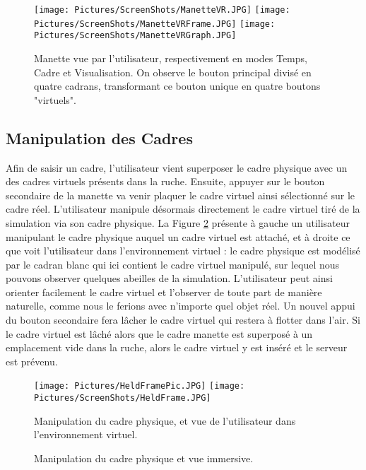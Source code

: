 		\begin{figure}
		\centering
		\texttt{[image: Pictures/ScreenShots/ManetteVR.JPG]}
		\texttt{[image: Pictures/ScreenShots/ManetteVRFrame.JPG]}
		\texttt{[image: Pictures/ScreenShots/ManetteVRGraph.JPG]}
		\caption[Modes de manette vus par l'utilisateur.]{Manette vue par l'utilisateur, respectivement en modes Temps, Cadre et Visualisation. On observe le bouton principal divisé en quatre cadrans, transformant ce bouton unique en quatre boutons "virtuels".}
		\label{ManetteVR}
		\end{figure}
		
		\subsection{Manipulation des Cadres}		
		
			
		Afin de saisir un cadre, l'utilisateur vient superposer le cadre physique avec un des cadres virtuels présents dans la ruche. Ensuite, appuyer sur le bouton secondaire de la manette va venir plaquer le cadre virtuel ainsi sélectionné sur le cadre réel. L'utilisateur manipule désormais directement le cadre virtuel tiré de la simulation via son cadre physique. La Figure \ref{equiVRTUI} présente à gauche un utilisateur manipulant le cadre physique auquel un cadre virtuel est attaché, et à droite ce que voit l'utilisateur dans l'environnement virtuel : le cadre physique est modélisé par le cadran blanc qui ici contient le cadre virtuel manipulé, sur lequel nous pouvons observer quelques abeilles de la simulation. L'utilisateur peut ainsi orienter facilement le cadre virtuel et l'observer de toute part de manière naturelle, comme nous le ferions avec n'importe quel objet réel. Un nouvel appui du bouton secondaire fera lâcher le cadre virtuel qui restera à flotter dans l'air. Si le cadre virtuel est lâché alors que le cadre manette est superposé à un emplacement vide dans la ruche, alors le cadre virtuel y est inséré et le serveur est prévenu.	

	\begin{figure}
	\centering
	\texttt{[image: Pictures/HeldFramePic.JPG]}
	\texttt{[image: Pictures/ScreenShots/HeldFrame.JPG]}
	\caption{Manipulation du cadre physique et vue immersive.}{Manipulation du cadre physique, et vue de l'utilisateur dans l'environnement virtuel.}
	\label{equiVRTUI}
	\end{figure}
		
